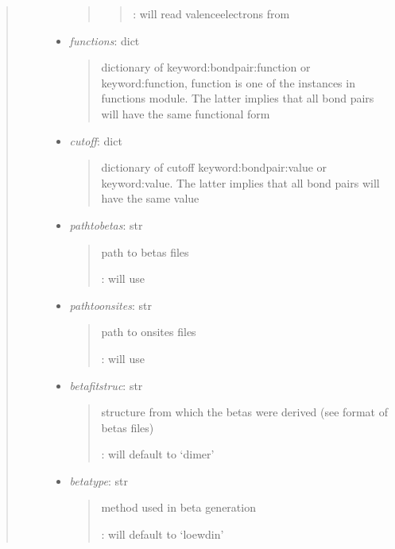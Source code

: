 \documentclass[letterpaper,10pt,english]{sphinxmanual}
\begin{document}
\begin{fulllineitems}
\begin{quote}
\begin{description}
\begin{itemize}
\begin{quote}
\begin{quote}
: will read valenceelectrons from 
\end{quote}
\end{quote}

\item {} 
\emph{functions}: dict
\begin{quote}

dictionary of keyword:bondpair:function or keyword:function, 
function is one of the instances in functions module. The latter
implies that all bond pairs will have the same functional form
\end{quote}

\item {} 
\emph{cutoff}: dict
\begin{quote}

dictionary of cutoff keyword:bondpair:value or keyword:value.
The latter implies that all bond pairs will have the same value
\end{quote}

\item {} 
\emph{pathtobetas}: str
\begin{quote}

path to betas files

: will use 
\end{quote}

\item {} 
\emph{pathtoonsites}: str
\begin{quote}

path to onsites files

: will use 
\end{quote}

\item {} 
\emph{betafitstruc}: str
\begin{quote}

structure from which the betas were derived (see format of betas 
files)

: will default to `dimer'
\end{quote}

\item {} 
\emph{betatype}: str
\begin{quote}

method used in beta generation

: will default to `loewdin'
\end{quote}


\end{itemize}
\end{description}
\end{quote}
\end{fulllineitems}
\end{document}
